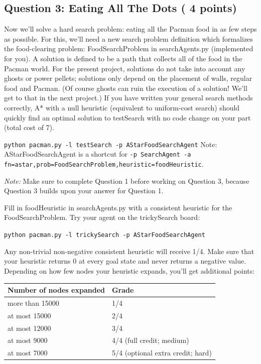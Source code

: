 \documentclass[a4paper, 11pt]{article}
\begin{document}
\subsection{Question 3: Eating All The Dots ( 4 points)}
Now we'll solve a hard search problem: eating all the Pacman food in as few steps as possible. For this, we'll need a new search problem definition which formalizes the food-clearing problem: \textsf{FoodSearchProblem} in \textsf{searchAgents.py} (implemented for you). A solution is defined to be a path that collects all of the food in the Pacman world. For the present project, solutions do not take into account any ghosts or power pellets; solutions only depend on the placement of walls, regular food and Pacman. (Of course ghosts can ruin the execution of a solution! We'll get to that in the next project.) If you have written your general search methods correctly, A* with a null heuristic (equivalent to uniform-cost search) should quickly find an optimal solution to testSearch with no code change on your part (total cost of 7).

\texttt{python pacman.py -l testSearch -p AStarFoodSearchAgent}
Note: AStarFoodSearchAgent is a shortcut for \texttt{-p SearchAgent -a fn=astar,prob=FoodSearchProblem,heuristic=foodHeuristic}.

\textit{Note:} Make sure to complete Question 1 before working on Question 3, because Question 3 builds upon your answer for Question 1.

Fill in \textsf{foodHeuristic} in \textsf{searchAgents.py} with a consistent heuristic for the \textsf{FoodSearchProblem}. Try your agent on the \textsf{trickySearch board}:

\texttt{python pacman.py -l trickySearch -p AStarFoodSearchAgent}

Any non-trivial non-negative consistent heuristic will receive 1/4. Make sure that your heuristic returns 0 at every goal state and never returns a negative value. Depending on how few nodes your heuristic expands, you'll get additional points:

\begin{center}
\begin{tabular}{||l||l||}
  \hline\hline
  Number of nodes expanded & Grade\\
  \hline\hline
  more than 15000 & 1/4\\
  \hline\hline
  at most 15000 & 2/4\\
  \hline\hline
  at most 12000 & 3/4\\
  \hline\hline
  at most 9000 & 4/4 (full credit; medium)\\
  \hline\hline
  at most 7000 & 5/4 (optional extra credit; hard)\\
  \hline\hline
\end{tabular}
\end{center}
\newpage
\end{document}
